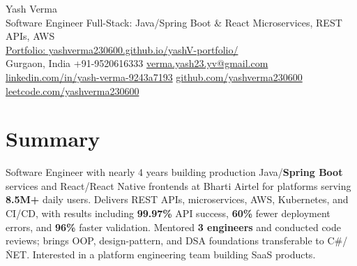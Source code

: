 \documentclass[letterpaper,11pt]{article}
\begin{document}
\begin{center}
  {\Huge Yash Verma} \\
  \small Software Engineer \textbar{} Full-Stack: Java/Spring Boot \& React \textbar{} Microservices, REST APIs, AWS \\
  \href{https://yashverma230600.github.io/yashV-portfolio/}{Portfolio: yashverma230600.github.io/yashV-portfolio/} \\
  \vspace{8pt}
  \small
  Gurgaon, India \textbar{}
  +91-9520616333 \textbar{}
  \href{mailto:verma.yash23.yv@gmail.com}{verma.yash23.yv@gmail.com} \textbar{}
  \href{https://www.linkedin.com/in/yash-verma-9243a7193/}{linkedin.com/in/yash-verma-9243a7193} \textbar{}
  \href{https://github.com/yashverma230600}{github.com/yashverma230600} \textbar{}
  \href{https://leetcode.com/yashverma230600}{leetcode.com/yashverma230600}
  \vspace{-8pt}
\end{center}

\section{Summary}
\begin{itemize}[leftmargin=0.15in, label={}]
  \small{\item{
    Software Engineer with nearly 4 years building production Java/\textbf{Spring Boot} services and React/React Native frontends at Bharti Airtel for platforms serving \textbf{8.5M+} daily users. Delivers REST APIs, microservices, AWS, Kubernetes, and CI/CD, with results including \textbf{99.97\%} API success, \textbf{60\%} fewer deployment errors, and \textbf{96\%} faster validation. Mentored \textbf{3 engineers} and conducted code reviews; brings OOP, design-pattern, and DSA foundations transferable to C\#/\.NET. Interested in a platform engineering team building SaaS products.
  }}
\end{itemize}
\vspace{-8pt}

\end{document}
